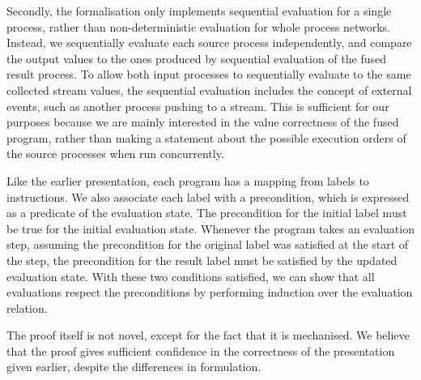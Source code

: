 Secondly, the formalisation only implements sequential evaluation for a single process, rather than non-deterministic evaluation for whole process networks.
Instead, we sequentially evaluate each source process independently, and compare the output values to the ones produced by sequential evaluation of the fused result process.
To allow both input processes to sequentially evaluate to the same collected stream values, the sequential evaluation includes the concept of external events, such as another process pushing to a stream.
This is sufficient for our purposes because we are mainly interested in the value correctness of the fused program, rather than making a statement about the possible execution orders of the source processes when run concurrently.

Like the earlier presentation, each program has a mapping from labels to instructions.
We also associate each label with a precondition, which is expressed as a predicate of the evaluation state.
The precondition for the initial label must be true for the initial evaluation state.
Whenever the program takes an evaluation step, assuming the precondition for the original label was satisfied at the start of the step, the precondition for the result label must be satisfied by the updated evaluation state.
With these two conditions satisfied, we can show that all evaluations respect the preconditions by performing induction over the evaluation relation.

The proof itself is not novel, except for the fact that it is mechanised.
We believe that the proof gives sufficient confidence in the correctness of the presentation given earlier, despite the differences in formulation.

% 
